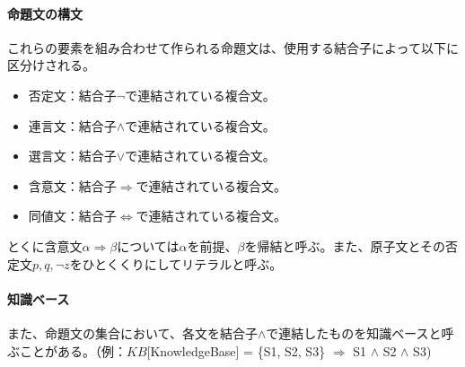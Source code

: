\documentclass[dvipdfmx]{jsarticle}
\begin{document}
  \paragraph{命題文の構文}
  これらの要素を組み合わせて作られる命題文は、使用する結合子によって以下に区分けされる。
  \begin{itemize}
    \item 否定文：結合子$\neg$で連結されている複合文。
    \item 連言文：結合子$\wedge$で連結されている複合文。
    \item 選言文：結合子$\vee$で連結されている複合文。
    \item 含意文：結合子$\Rightarrow$で連結されている複合文。
    \item 同値文：結合子$\Leftrightarrow$で連結されている複合文。
  \end{itemize}
  とくに含意文$\alpha \Rightarrow \beta$については$\alpha$を前提、$\beta$を帰結と呼ぶ。また、原子文とその否定文$p, q, \neg z$をひとくくりにしてリテラルと呼ぶ。
  \paragraph{知識ベース}また、命題文の集合において、各文を結合子$\wedge$で連結したものを知識ベースと呼ぶことがある。（例：$KB$[KnowledgeBase] = \{S1, S2, S3\} $\Rightarrow$ S1 $\wedge$ S2 $\wedge$ S3)
\end{document}
